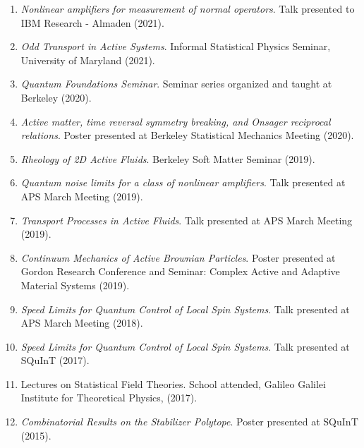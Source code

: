\documentclass[]{article}
\begin{document}
\begin{enumerate}	
\item \textit{Nonlinear amplifiers for measurement of normal operators}. Talk presented to IBM Research - Almaden (2021).

\item \textit{Odd Transport in Active Systems}. Informal Statistical Physics Seminar, University of Maryland (2021).
	
\item \textit{Quantum Foundations Seminar}. Seminar series organized and taught at Berkeley (2020).

\item\textit{Active matter, time reversal symmetry breaking, and Onsager reciprocal relations}. Poster presented at Berkeley Statistical Mechanics Meeting (2020).
	
\item\textit{Rheology of 2D Active Fluids}. Berkeley Soft Matter Seminar (2019).	

\item \textit{Quantum noise limits for a class of nonlinear amplifiers}. Talk presented at APS March Meeting (2019).

\item \textit{Transport Processes in Active Fluids}. Talk presented at APS March Meeting (2019).



\item \textit{Continuum Mechanics of Active Brownian Particles}. Poster presented at Gordon Research Conference and Seminar: Complex Active and Adaptive Material Systems (2019).	

\item \textit{Speed Limits for Quantum Control of Local Spin Systems}. Talk presented at APS March Meeting (2018).


\item \textit{Speed Limits for Quantum Control of Local Spin Systems}. Talk presented at SQuInT (2017).


\item Lectures on Statistical Field Theories. School attended, Galileo Galilei Institute for Theoretical Physics, (2017).


\item \textit{Combinatorial Results on the Stabilizer Polytope}. Poster presented at SQuInT (2015).


\end{enumerate}
\end{document}
